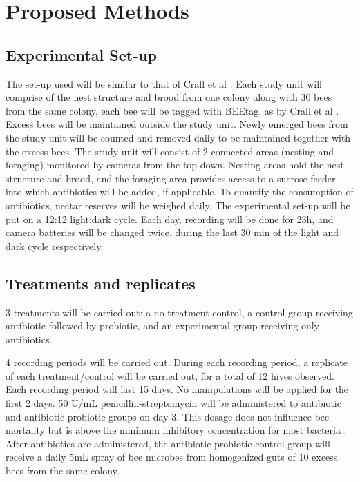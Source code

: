 \documentclass[11pt]{article} %
\begin{document}
    \section{Proposed Methods}
        \subsection{Experimental Set-up}
            The set-up used will be similar to that of Crall et al
            \parencite*{crall2018neonicotinoid}.
            Each study unit will comprise of the nest structure and brood from one colony along with 30 bees from the same colony,
            each bee will be tagged with BEEtag, as by Crall et al
            \parencite*{crall2015beetag}.
            Excess bees will be maintained outside the study unit.
            Newly emerged bees from the study unit will be counted and removed daily to be maintained together with the excess bees.
            The study unit will consist of 2 connected areas (nesting and foraging) monitored by cameras from the top down.
            Nesting areas hold the nest structure and brood,
            and the foraging area provides access to a sucrose feeder
            into which antibiotics will be added, if applicable.
            To quantify the consumption of antibiotics,
            nectar reserves will be weighed daily.
            The experimental set-up will be put on a 12:12 light:dark cycle.
            Each day, recording will be done for 23h,
            and camera batteries will be changed twice, during the last 30 min of the light and dark cycle respectively.
 
        \subsection{Treatments and replicates}
            3 treatments will be carried out: a no treatment control,
            a control group receiving antibiotic followed by probiotic,
            and an experimental group receiving only antibiotics.

            4 recording periods will be carried out.
            During each recording period,
            a replicate of each treatment/control will be carried out,
            for a total of 12 hives observed.
            Each recording period will last 15 days.
            No manipulations will be applied for the first 2 days.
            50 U/mL penicillin-streptomycin will be administered to antibiotic and antibiotic-probiotic groups on day 3.
            This dosage does not influence bee mortality but is above the minimum inhibitory concentration for most bacteria
            \parencite{miernik2007influence}.
            After antibiotics are administered,
            the antibiotic-probiotic control group will receive a daily 5\si{\milli\liter} spray of bee microbes from homogenized guts of 10 excess bees from the same colony.
            
\end{document}
